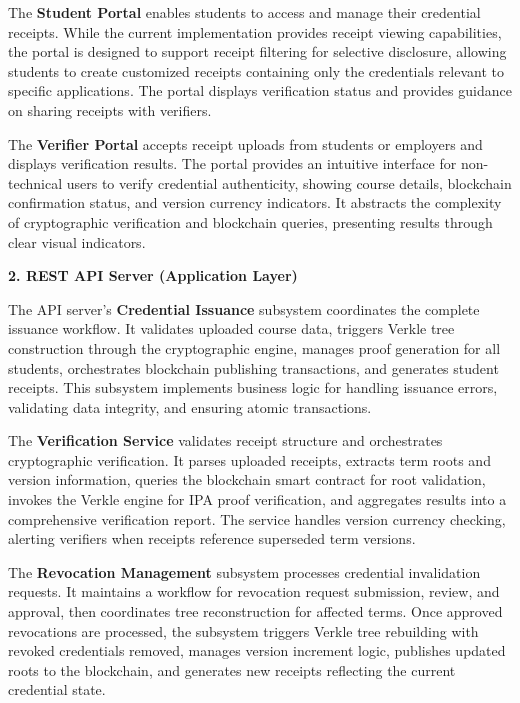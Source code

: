 The \textbf{Student Portal} enables students to access and manage their credential receipts. While the current implementation provides receipt viewing capabilities, the portal is designed to support receipt filtering for selective disclosure, allowing students to create customized receipts containing only the credentials relevant to specific applications. The portal displays verification status and provides guidance on sharing receipts with verifiers.

The \textbf{Verifier Portal} accepts receipt uploads from students or employers and displays verification results. The portal provides an intuitive interface for non-technical users to verify credential authenticity, showing course details, blockchain confirmation status, and version currency indicators. It abstracts the complexity of cryptographic verification and blockchain queries, presenting results through clear visual indicators.

\textbf{2. REST API Server (Application Layer)}

The API server's \textbf{Credential Issuance} subsystem coordinates the complete issuance workflow. It validates uploaded course data, triggers Verkle tree construction through the cryptographic engine, manages proof generation for all students, orchestrates blockchain publishing transactions, and generates student receipts. This subsystem implements business logic for handling issuance errors, validating data integrity, and ensuring atomic transactions.

The \textbf{Verification Service} validates receipt structure and orchestrates cryptographic verification. It parses uploaded receipts, extracts term roots and version information, queries the blockchain smart contract for root validation, invokes the Verkle engine for IPA proof verification, and aggregates results into a comprehensive verification report. The service handles version currency checking, alerting verifiers when receipts reference superseded term versions.

The \textbf{Revocation Management} subsystem processes credential invalidation requests. It maintains a workflow for revocation request submission, review, and approval, then coordinates tree reconstruction for affected terms. Once approved revocations are processed, the subsystem triggers Verkle tree rebuilding with revoked credentials removed, manages version increment logic, publishes updated roots to the blockchain, and generates new receipts reflecting the current credential state.

